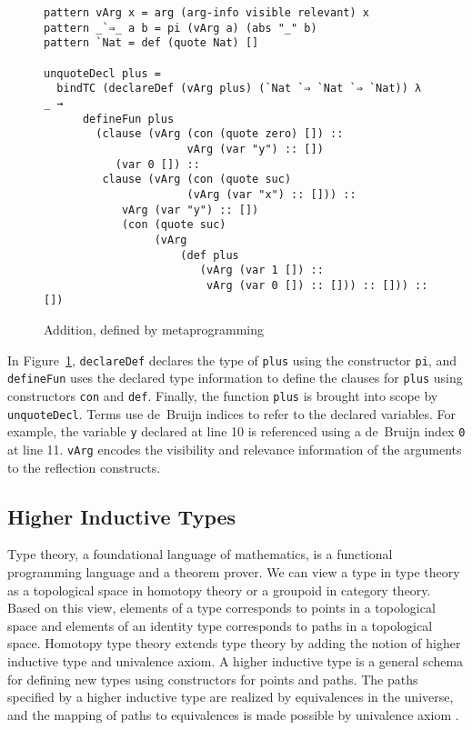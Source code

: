 \documentclass[sigplan,10pt]{acmart}
\begin{document}
\begin{figure}
\begingroup
\fontsize{7pt}{9pt}\selectfont
\begin{Verbatim}
pattern vArg x = arg (arg-info visible relevant) x
pattern _`⇒_ a b = pi (vArg a) (abs "_" b)
pattern `Nat = def (quote Nat) []

unquoteDecl plus =
  bindTC (declareDef (vArg plus) (`Nat `⇒ `Nat `⇒ `Nat)) λ _ → 
      defineFun plus
        (clause (vArg (con (quote zero) []) ::
                      vArg (var "y") :: [])
           (var 0 []) ::
         clause (vArg (con (quote suc)
                      (vArg (var "x") :: [])) ::
            vArg (var "y") :: [])
            (con (quote suc)
                 (vArg
                     (def plus
                        (vArg (var 1 []) ::
                         vArg (var 0 []) :: [])) :: [])) :: [])
\end{Verbatim}
\endgroup
\caption{Addition, defined by metaprogramming}
\label{fig:plusmeta}
\end{figure}


In Figure~\ref{fig:plusmeta}, {\tt declareDef} declares the type of {\tt plus} using the constructor {\tt pi}, and {\tt defineFun} uses the declared type information to define the clauses for {\tt plus} using constructors {\tt con} and {\tt def}. Finally, the function {\tt plus} is brought into scope by {\tt unquoteDecl}. Terms use de~Bruijn indices to refer to the declared variables. For example, the variable {\tt y} declared at line 10 is referenced using a de~Bruijn index {\tt 0} at line 11. {\tt vArg} encodes the visibility and relevance information of the arguments to the reflection constructs.

\subsection{Higher Inductive Types}
\label{sec:sec2.2}

Type theory, a foundational language of mathematics, is a functional programming language and a theorem prover. We can view a type in type theory as a topological space in homotopy theory or a groupoid in category theory. Based on this view, elements of a type corresponds to points in a topological space and elements of an identity type corresponds to paths in a topological space. Homotopy type theory extends type theory by adding the notion of higher inductive type and univalence axiom. A higher inductive type is a general schema for defining new types using constructors for points and paths. The paths specified by a higher inductive type are realized by equivalences in the universe, and the mapping of paths to equivalences is made possible by univalence axiom \cite{HoTT-2013}.
\end{document}

